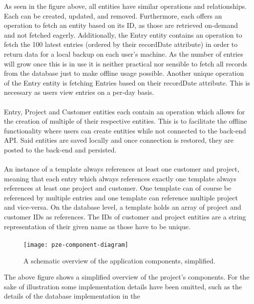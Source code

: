 As seen in the figure above, all entities have similar operations and relationships. 
Each can be created, updated, and removed.
Furthermore, each offers an operation to fetch an entity based on its ID, as those are retrieved on-demand and not 
fetched eagerly.
Additionally, the Entry entity contains an operation to fetch the 100 latest entries (ordered by their recordDate attribute) in
order to return data for a local backup on each user's machine.
As the number of entries will grow once this is in use it is neither practical nor sensible to fetch all records from the database
just to make offline usage possible. 
Another unique operation of the Entry entity is fetching Entries based on their recordDate attribute. 
This is necessary as users view entries on a per-day basis.\paragraph{}
Entry, Project and Customer entities each contain an operation which allows for the creation of multiple of their respective entities.
This is to facilitate the offline functionality where users can create entities while not connected to the back-end API. 
Said entities are saved locally and once connection is restored, they are posted to the back-end and persisted.\paragraph{}
An instance of a template always references at least one customer and project, meaning that each entry which always references exactly one template 
always references at least one project and customer. 
One template can of course be referenced by multiple entries and one template can reference multiple project and vice-versa.
On the database level, a template holds an array of project and customer IDs as references.
The IDs of customer and project entities are a string representation of their given name as those have to be unique.\paragraph{}
\begin{figure}[H]
  \centering
  \label{fig:pze-component-diagram}
  \caption{A schematic overview of the application components, simplified.}
  \texttt{[image: pze-component-diagram]}
\end{figure}
The above figure shows a simplified overview of the project's components. 
For the sake of illustration some implementation details have been omitted, such as the details of the database implementation in the 
